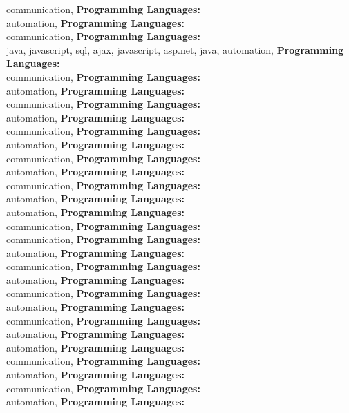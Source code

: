 communication, \textbf{Programming Languages:} \\
automation, \textbf{Programming Languages:} \\
communication, \textbf{Programming Languages:} \\
java, javascript, sql, ajax, javascript, asp.net, java, automation, \textbf{Programming Languages:} \\
communication, \textbf{Programming Languages:} \\
automation, \textbf{Programming Languages:} \\
communication, \textbf{Programming Languages:} \\
automation, \textbf{Programming Languages:} \\
communication, \textbf{Programming Languages:} \\
automation, \textbf{Programming Languages:} \\
communication, \textbf{Programming Languages:} \\
automation, \textbf{Programming Languages:} \\
communication, \textbf{Programming Languages:} \\
automation, \textbf{Programming Languages:} \\
automation, \textbf{Programming Languages:} \\
communication, \textbf{Programming Languages:} \\
communication, \textbf{Programming Languages:} \\
automation, \textbf{Programming Languages:} \\
communication, \textbf{Programming Languages:} \\
automation, \textbf{Programming Languages:} \\
communication, \textbf{Programming Languages:} \\
automation, \textbf{Programming Languages:} \\
communication, \textbf{Programming Languages:} \\
automation, \textbf{Programming Languages:} \\
automation, \textbf{Programming Languages:} \\
communication, \textbf{Programming Languages:} \\
automation, \textbf{Programming Languages:} \\
communication, \textbf{Programming Languages:} \\
automation, \textbf{Programming Languages:} \\
